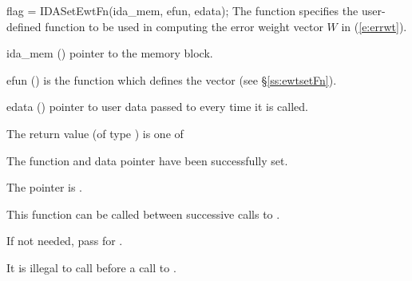 {
flag = IDASetEwtFn(ida\_mem, efun, edata);
}
{
  The function  specifies the user-defined function
  to be used in computing the error weight vector $W$ in (\ref{e:errwt}).
}
{
  \begin{args}
  \item[ida\_mem] ()
    pointer to the {\ida} memory block.
  \item[efun] () 
    is the {\C} function which defines the  vector (see \S\ref{ss:ewtsetFn}).
  \item[edata] ()
    pointer to user data passed to  every time it is called.
  \end{args}
}
{
  The return value  (of type ) is one of
  \begin{args}
  \item[\Id{IDA\_SUCCESS}] 
    The function  and data pointer  have been successfully set.
  \item[\Id{IDA\_MEM\_NULL}]
    The  pointer is .
  \end{args}
}
{
  This function can be called between successive calls to .

  If not needed, pass  for .

  {\warn} It is illegal to call  before a call to .
}
